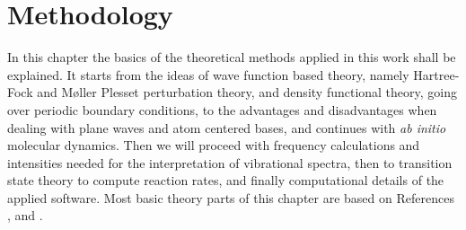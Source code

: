 \documentclass[11pt,DIV=13,BCOR=5mm,a4paper,headinclude]{scrbook}
\begin{document}
\chapter{Methodology}
In this chapter the basics of the theoretical methods applied in this work shall be explained.
It starts from the ideas of wave function based theory, namely Hartree-Fock and M\o{}ller Plesset perturbation theory, and density functional theory, going over periodic boundary conditions, to the advantages and disadvantages when dealing with plane waves and atom centered bases, and continues with \textit{ab initio} molecular dynamics.
Then we will proceed with frequency calculations and intensities needed for the interpretation of vibrational spectra, then to transition state theory to compute reaction rates, and finally computational details of the applied software.
Most basic theory parts of this chapter are based on References \cite{jensen}, \cite{Gross03} and \cite{szabo}.
\end{document}

